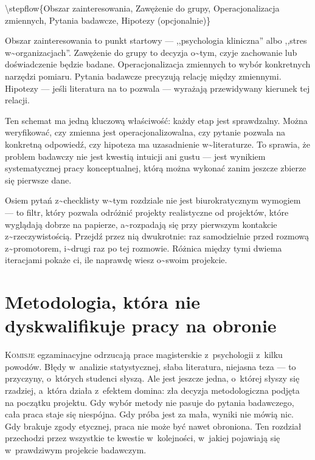 \documentclass[12pt,a4paper,twoside,openany]{book}
\begin{document}
\textbackslash{}stepflow\{Obszar zainteresowania, Zawężenie do grupy, Operacjonalizacja zmiennych, Pytania badawcze, Hipotezy (opcjonalnie)\}


Obszar zainteresowania to punkt startowy --- ,,psychologia kliniczna'' albo ,,stres w\textasciitilde{}organizacjach''. Zawężenie do grupy to decyzja o\textasciitilde{}tym, czyje zachowanie lub doświadczenie będzie badane. Operacjonalizacja zmiennych to wybór konkretnych narzędzi pomiaru. Pytania badawcze precyzują relację między zmiennymi. Hipotezy --- jeśli literatura na to pozwala --- wyrażają przewidywany kierunek tej relacji.


Ten schemat ma jedną kluczową właściwość: każdy etap jest sprawdzalny. Można weryfikować, czy zmienna jest operacjonalizowalna, czy pytanie pozwala na konkretną odpowiedź, czy hipoteza ma uzasadnienie w\textasciitilde{}literaturze. To sprawia, że problem badawczy nie jest kwestią intuicji ani gustu --- jest wynikiem systematycznej pracy konceptualnej, którą można wykonać zanim jeszcze zbierze się pierwsze dane.


\begin{keyinsight} Osiem pytań z\textasciitilde{}checklisty w\textasciitilde{}tym rozdziale nie jest biurokratycznym wymogiem --- to filtr, który pozwala odróżnić projekty realistyczne od projektów, które wyglądają dobrze na papierze, a\textasciitilde{}rozpadają się przy pierwszym kontakcie z\textasciitilde{}rzeczywistością. Przejdź przez nią dwukrotnie: raz samodzielnie przed rozmową z\textasciitilde{}promotorem, i\textasciitilde{}drugi raz po tej rozmowie. Różnica między tymi dwiema iteracjami pokaże ci, ile naprawdę wiesz o\textasciitilde{}swoim projekcie.
\end{keyinsight}
\clearpage

\chapter{Metodologia, która nie dyskwalifikuje pracy na obronie}

\lettrine{K}{omisje} egzaminacyjne odrzucają prace magisterskie z~psychologii z~kilku powodów. Błędy w~analizie statystycznej, słaba literatura, niejasna teza --- to przyczyny, o~których studenci słyszą. Ale jest jeszcze jedna, o~której słyszy się rzadziej, a~która działa z~efektem domina: zła decyzja metodologiczna podjęta na początku projektu. Gdy wybór metody nie pasuje do pytania badawczego, cała praca staje się niespójna. Gdy próba jest za mała, wyniki nie mówią nic. Gdy brakuje zgody etycznej, praca nie może być nawet obroniona. Ten rozdział przechodzi przez wszystkie te kwestie w~kolejności, w~jakiej pojawiają się w~prawdziwym projekcie badawczym.
\end{document}
